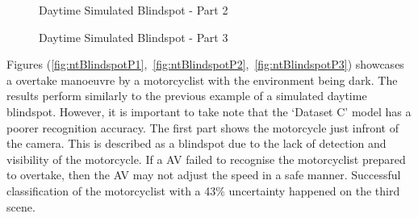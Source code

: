 \documentclass[12pt]{report} %
\begin{document}
		\begin{figure}[hb]
			\begin{floatrow}
				{
					\caption{Daytime Simulated Blindspot - Part 2}
					\label{fig:dtSimulatedBlindspotP2}
				}
			
				{
					\caption{Daytime Simulated Blindspot - Part 3}
					\label{fig:dtSimulatedBlindspotP3}
				}
			\end{floatrow}
		\end{figure}

		\clearpage
		Figures (\ref{fig:ntBlindspotP1},~\ref{fig:ntBlindspotP2},~\ref{fig:ntBlindspotP3}) showcases a overtake manoeuvre by a motorcyclist with the environment being dark. The results perform similarly to the previous example of a simulated daytime blindspot. However, it is important to take note that the `Dataset C' model has a poorer recognition accuracy. The first part shows the motorcycle just infront of the camera. This is described as a blindspot due to the lack of detection and visibility of the motorcycle. If a AV failed to recognise the motorcyclist prepared to overtake, then the AV may not adjust the speed in a safe manner. Successful classification of the motorcyclist with a 43\% uncertainty happened on the third scene.
\end{document}
